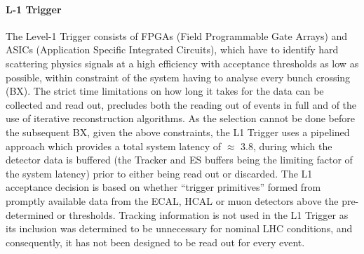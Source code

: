 \paragraph{L-1 Trigger}\label{paragraph:L1}
The Level-1 Trigger consists of FPGAs (Field Programmable Gate Arrays) and ASICs (Application Specific Integrated Circuits), which have to identify hard scattering physics signals at a high efficiency with acceptance thresholds as low as possible, within constraint of the system having to analyse every bunch crossing (BX).
The strict time limitations on how long it takes for the data can be collected and read out, precludes both the reading out of events in full and of the use of iterative reconstruction algorithms.
As the selection cannot be done before the subsequent BX, given the above constraints, the L1 Trigger uses a pipelined approach which provides a total system latency of $\approx$ 3.8\mus, during which the detector data is buffered (the Tracker and ES buffers being the limiting factor of the system latency) prior to either being read out or discarded.
The L1 acceptance decision is based on whether ``trigger primitives'' formed from promptly available data from the ECAL, HCAL or muon detectors above the pre-determined \pT or \ET thresholds.
Tracking information is not used in the L1 Trigger as its inclusion was determined to be unnecessary for nominal LHC conditions, and consequently, it has not been designed to be read out for every event.

